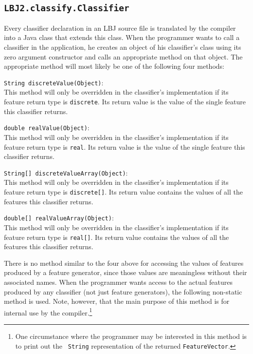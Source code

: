 \subsection{{\tt LBJ2.classify.Classifier}} \label{subsection:classifier}
Every classifier declaration in an LBJ source file is translated by the
compiler into a Java class that extends this class.  When the programmer wants
to call a classifier in the application, he creates an object of his
classifier's class using its zero argument constructor and calls an
appropriate method on that object.  The appropriate method will most likely be
one of the following four methods:

\begin{list}{}{}
\item[{\tt String discreteValue(Object)}:] ~\\
This method will only be overridden in the classifier's implementation if its
feature return type is {\tt discrete}.  Its return value is the value of the
single feature this classifier returns.

\item[{\tt double realValue(Object)}:] ~\\
This method will only be overridden in the classifier's implementation if its
feature return type is {\tt real}.  Its return value is the value of the
single feature this classifier returns.

\item[{\tt String[] discreteValueArray(Object)}:] ~\\
This method will only be overridden in the classifier's implementation if its
feature return type is {\tt discrete[]}.  Its return value contains the values
of all the features this classifier returns.

\item[{\tt double[] realValueArray(Object)}:] ~\\
This method will only be overridden in the classifier's implementation if its
feature return type is {\tt real[]}.  Its return value contains the values of
all the features this classifier returns.
\end{list}

There is no method similar to the four above for accessing the values of
features produced by a feature generator, since those values are meaningless
without their associated names.  When the programmer wants access to the
actual features produced by any classifier (not just feature generators), the
following non-static method is used.  Note, however, that the main purpose of
this method is for internal use by the compiler.\footnote{One circumstance
where the programmer may be interested in this method is to print out the {\tt
String} representation of the returned {\tt FeatureVector}.}


